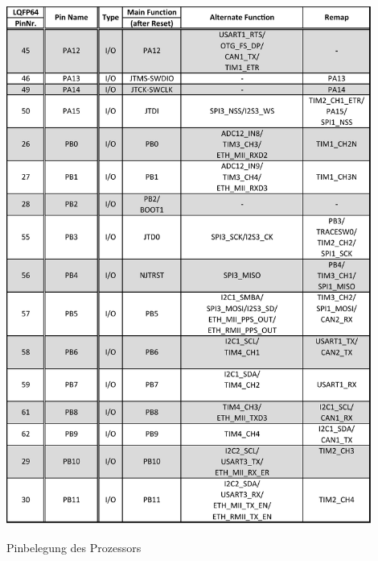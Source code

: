 \begin{table}[H]\ContinuedFloat
    \centering
    \includegraphics[width=0.9\textwidth]{Schuh/Pictures/Pinbelegung2}
    \caption[Pinbelegung des Prozessors]{Pinbelegung des Prozessors \cite{stm:stm32f107rc}}
\end{table}
